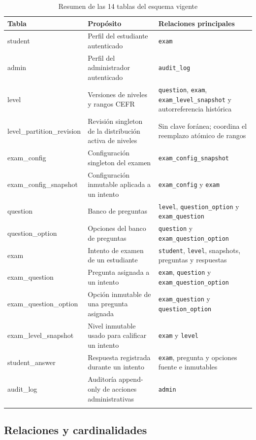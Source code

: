 \begin{longtable}{p{3.5cm} p{5cm} p{5cm}}
\toprule
\textbf{Tabla} & \textbf{Propósito} & \textbf{Relaciones principales} \\
\midrule
\endhead
student & Perfil del estudiante autenticado & \texttt{exam} \\
admin & Perfil del administrador autenticado & \texttt{audit\_log} \\
level & Versiones de niveles y rangos CEFR & \texttt{question}, \texttt{exam}, \texttt{exam\_level\_snapshot} y autorreferencia histórica \\
level\_partition\_revision & Revisión singleton de la distribución activa de niveles & Sin clave foránea; coordina el reemplazo atómico de rangos \\
exam\_config & Configuración singleton del examen & \texttt{exam\_config\_snapshot} \\
exam\_config\_snapshot & Configuración inmutable aplicada a un intento & \texttt{exam\_config} y \texttt{exam} \\
question & Banco de preguntas & \texttt{level}, \texttt{question\_option} y \texttt{exam\_question} \\
question\_option & Opciones del banco de preguntas & \texttt{question} y \texttt{exam\_question\_option} \\
exam & Intento de examen de un estudiante & \texttt{student}, \texttt{level}, snapshots, preguntas y respuestas \\
exam\_question & Pregunta asignada a un intento & \texttt{exam}, \texttt{question} y \texttt{exam\_question\_option} \\
exam\_question\_option & Opción inmutable de una pregunta asignada & \texttt{exam\_question} y \texttt{question\_option} \\
exam\_level\_snapshot & Nivel inmutable usado para calificar un intento & \texttt{exam} y \texttt{level} \\
student\_answer & Respuesta registrada durante un intento & \texttt{exam}, pregunta y opciones fuente e inmutables \\
audit\_log & Auditoría append-only de acciones administrativas & \texttt{admin} \\
\bottomrule
\caption{Resumen de las 14 tablas del esquema vigente}
\label{tab:resumen-esquema}
\end{longtable}

\subsection{Relaciones y cardinalidades}

